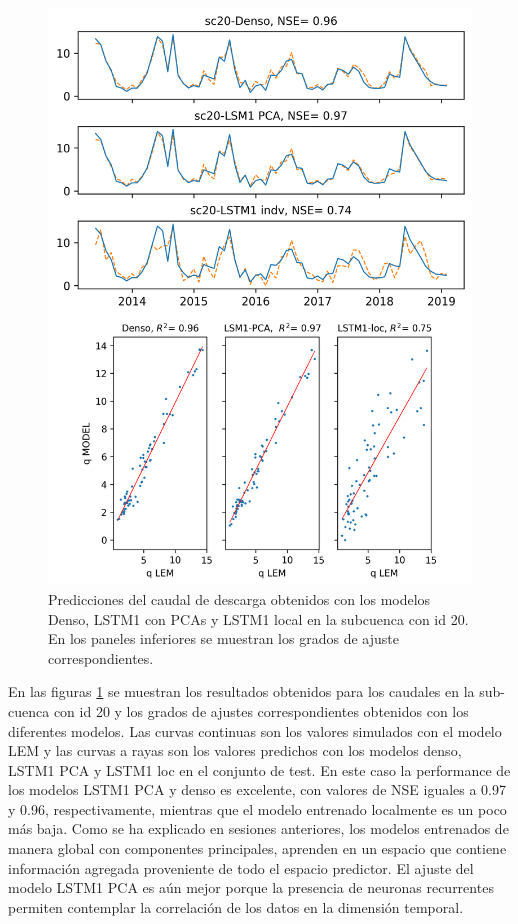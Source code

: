 \begin{figure}[h!]
  \begin{center}
    \includegraphics[height=6.in]{Figures/comp_grilla/resultados_sc20}
    \caption{ Predicciones del caudal de descarga obtenidos con los modelos Denso, LSTM1 con PCAs y LSTM1 local en la subcuenca 
    con id 20. En los
    paneles inferiores se muestran los grados de ajuste correspondientes.}
    \label{alcomp20}
  \end{center}
\end{figure}



En las figuras \ref{alcomp20} se muestran  los resultados obtenidos para los caudales en la sub-cuenca con id 20
y los grados de ajustes correspondientes obtenidos con los diferentes modelos.
Las curvas continuas son los valores simulados con el modelo LEM y las curvas a rayas son los valores predichos 
con los modelos denso, LSTM1 PCA y LSTM1 loc en el conjunto de test. En este caso la performance de los modelos
LSTM1 PCA y denso es excelente, con valores de NSE iguales a 0.97 y 0.96, respectivamente, 
mientras que el modelo entrenado localmente es un poco más baja. Como se ha explicado en sesiones anteriores, los
modelos entrenados de manera global con componentes principales, aprenden en un espacio que contiene información agregada
proveniente de todo el espacio predictor. El ajuste del modelo LSTM1 PCA es aún mejor porque la presencia de neuronas recurrentes 
permiten contemplar la correlación de los datos en la dimensión temporal.




